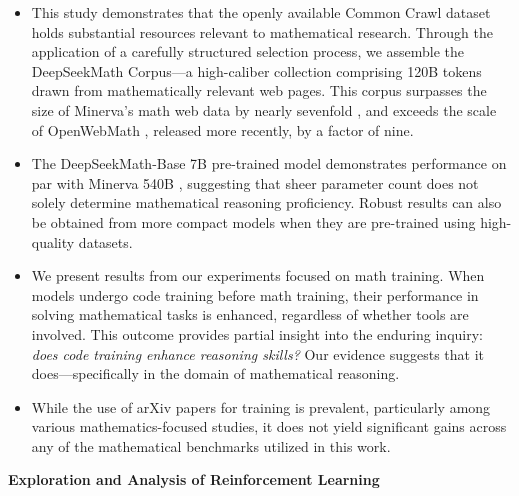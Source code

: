 \begin{itemize}[topsep=0pt]
    \item This study demonstrates that the openly available Common Crawl dataset holds substantial resources relevant to mathematical research. Through the application of a carefully structured selection process, we assemble the DeepSeekMath Corpus—a high-caliber collection comprising 120B tokens drawn from mathematically relevant web pages. This corpus surpasses the size of Minerva's math web data by nearly sevenfold \citep{minerva}, and exceeds the scale of OpenWebMath \citep{openwebmath}, released more recently, by a factor of nine.

\item The DeepSeekMath-Base 7B pre-trained model demonstrates performance on par with Minerva 540B \citep{minerva}, suggesting that sheer parameter count does not solely determine mathematical reasoning proficiency. Robust results can also be obtained from more compact models when they are pre-trained using high-quality datasets.

\item We present results from our experiments focused on math training. When models undergo code training before math training, their performance in solving mathematical tasks is enhanced, regardless of whether tools are involved. This outcome provides partial insight into the enduring inquiry: \textit{does code training enhance reasoning skills?} Our evidence suggests that it does—specifically in the domain of mathematical reasoning.

\item While the use of arXiv papers for training is prevalent, particularly among various mathematics-focused studies, it does not yield significant gains across any of the mathematical benchmarks utilized in this work.
\end{itemize}

\textbf{Exploration and Analysis of Reinforcement Learning}

